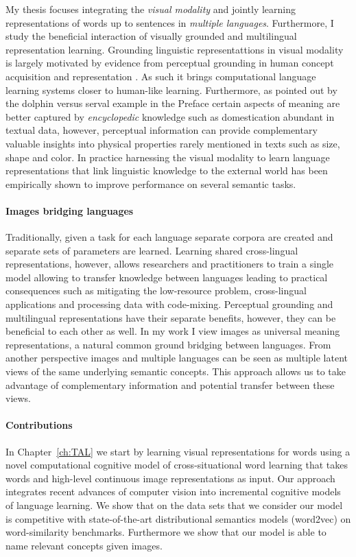 My thesis focuses integrating the \emph{visual modality} and jointly learning representations 
of words up to sentences in \emph{multiple languages}. Furthermore, I study the beneficial interaction of
visually grounded and multilingual representation learning.
Grounding linguistic representattions in visual modality is largely motivated by evidence from
perceptual grounding in human concept acquisition and representation \citep{barsalou2003grounding}.
As such it brings computational language learning systems closer to human-like learning.
Furthermore, as pointed out by the dolphin versus serval example in the Preface
certain aspects of meaning are better captured by \emph{encyclopedic}
knowledge such as domestication abundant in textual data, however, perceptual information
can provide complementary valuable insights into physical properties rarely mentioned in texts such as size,
shape and color. In practice harnessing the visual modality to learn language
representations that link linguistic knowledge
to the external world \citep{kiela2014improving,baroni2016grounding,elliott2017imagination,kiela2017learning,yoo2017improving}
has been empirically shown to improve performance on several semantic tasks.

\paragraph{Images bridging languages}

Traditionally, given a task for each language separate corpora are created and
separate sets of parameters are learned.
Learning shared cross-lingual representations, however, allows researchers
and practitioners to train a single model allowing to transfer knowledge
between languages leading to practical consequences
such as mitigating the low-resource problem, cross-lingual applications and
processing data with code-mixing.
Perceptual grounding and multilingual representations have their separate benefits,
however, they can be beneficial to each other as well.
In my work I view images as universal meaning representations, a natural common
ground bridging between languages. From another perspective images and multiple
languages can be seen as multiple latent views of the same underlying semantic
concepts. This approach allows us to take advantage of complementary information
and potential transfer between these views.

\paragraph{Contributions}
In Chapter~\ref{ch:TAL} we start by learning visual representations for words using a
novel computational cognitive model of cross-situational word learning that
takes words and high-level continuous image representations as input. Our approach
integrates recent advances of computer vision into incremental cognitive models
of language learning. We show that on the data sets that we consider our model
is competitive with state-of-the-art distributional semantics models (word2vec)
on word-similarity benchmarks. Furthermore we show that our model is able to
name relevant concepts given images.

